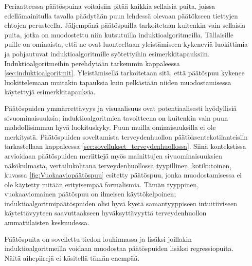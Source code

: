 \documentclass[12pt,finnish]{tktltiki2}
\theoremstyle{definition}
\theoremstyle{remark}
\begin{document}
Periaatteessa päätöspuina voitaisiin pitää kaikkia sellaisia puita, joissa edellämainitulla tavalla
päädytään puun lehdessä olevaan päätökseen tiettyjen ehtojen perusteella. Jäljempänä päätöspuilla
tarkoitetaan kuitenkin vain sellaisia puita, jotka on muodostettu niin kutsutuilla induktioalgoritmeilla.
Tällaisille puille on ominaista, että ne ovat luonteeltaan yleistämiseen kykeneviä luokittimia ja
pohjautuvat induktioalgoritmille syötettyihin esimerkkitapauksiin. Induktioalgoritmeihin
perehdytään tarkemmin kappaleessa \ref{sec:induktioalgoritmit}. Yleistämisellä tarkoitetaan sitä,
että päätöspuu kykenee luokittelemaan muitakin tapauksia kuin pelkästään niiden muodostamisessa
käytettyjä esimerkkitapauksia.

Päätöspuiden ymmärrettävyys ja visuaalisuus ovat potentiaalisesti hyödyllisiä sivuominaisuuksia;
induktioalgoritmien tavoitteena on kuitenkin vain puun mahdollisimman hyvä luokituskyky. Puun muilla
ominaisuuksilla ei ole merkitystä. Päätöspuiden soveltamista terveydenhuollon päätöksentekotilanteisiin
tarkastellaan kappaleessa \ref{sec:sovellukset_terveydenhuollossa}. Siinä kontekstissa arvioidaan
päätöspuiden meriittejä myös mainittujen sivuominaisuuksien näkökulmasta, vertailukohtana
terveydenhuollossa tyypillinen, kotikutoinen, kuvassa \ref{fig:Vuokaaviopäätöspuu} esitetty päätöspuu,
jonka muodostamisessa ei ole käytetty mitään erityisempää formalismia. Tämän tyyppinen, vuokaaviomainen
päätöspuu on ilmeisen käyttökelpoinen; induktioalgoritmipäätöspuiden olisi hyvä kyetä samantyyppiseen
intuitiiviseen käytettävyyteen saavuttaakseen hyväksyttävyyttä terveydenhuollon ammattilaisten
keskuudessa.
 
Päätöspuita on sovellettu tiedon louhinnassa ja lisäksi joillakin induktioalgoritmeilla voidaan muodostaa
päätöspuiden lisäksi regressiopuita. Näitä aihepiirejä ei käsitellä tämän enempää.
\end{document}
